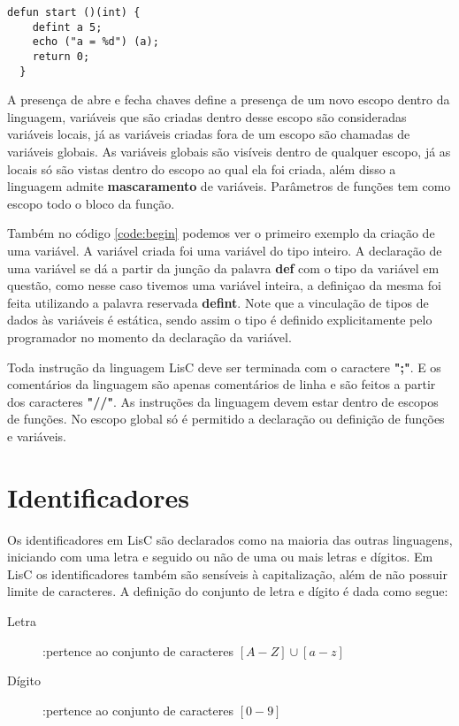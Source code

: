 \documentclass[
  12pt,				%
  oneside,			%
  a4paper,			%
  english,			%
  french,				%
  spanish,			%
  brazil,				%
]{abntex2}
\begin{document}
\begin{lstlisting}[label={code:begin},caption=Código
    exemplo de uma função begin.]
  defun start ()(int) {
    defint a 5;
    echo ("a = %d") (a);
    return 0;
  }
\end{lstlisting}

A presença de abre e fecha chaves define a presença de um
novo escopo dentro da linguagem, variáveis que são criadas dentro
desse escopo são consideradas variáveis locais, já as variáveis
criadas fora de um escopo são chamadas de variáveis globais. As
variáveis globais são visíveis dentro de qualquer escopo, já as locais
só são vistas dentro do escopo ao qual ela foi criada, além disso a
linguagem admite \textbf{mascaramento} de variáveis. Parâmetros de
funções tem como escopo todo o bloco da função.

Também no código \ref{code:begin} podemos ver o primeiro exemplo
da criação de uma variável. A variável criada foi uma variável do
tipo inteiro. A declaração de uma variável se dá a partir da junção da
palavra \textbf{def} com o tipo da variável em questão, como nesse
caso
tivemos uma variável inteira, a definiçao da mesma foi feita
utilizando
a palavra reservada \textbf{defint}. Note que a vinculação de tipos de
dados às variáveis é estática, sendo assim o tipo é definido
explicitamente pelo programador no momento da declaração da variável.

Toda instrução da linguagem LisC deve ser terminada com o caractere
\textbf{";"}. E os comentários da linguagem são apenas comentários de
linha e são feitos a partir dos caracteres \textbf{"//"}. As
instruções da linguagem devem estar dentro de escopos de funções. No
escopo global só é permitido a declaração ou definição de funções e
variáveis.

\chapter{Identificadores}
\label{cha:identificadores}
Os identificadores em LisC são declarados como na maioria das outras linguagens,
iniciando com uma letra e seguido ou não de uma ou mais letras e
dígitos. Em LisC os identificadores também são sensíveis à capitalização, além
de não possuir limite de caracteres. A definição do conjunto de letra
e dígito é dada como segue:

\begin{description}
\item [Letra]:pertence ao conjunto de caracteres $[A-Z]\cup[a-z]$
\item [Dígito]:pertence ao conjunto de caracteres $[0-9]$
\end{description}
\end{document}
